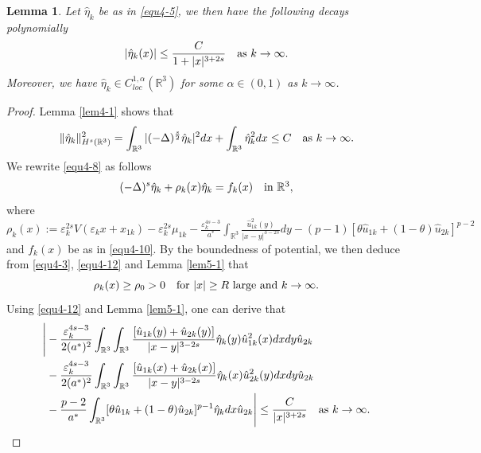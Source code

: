 \documentclass[reqno, 11pt]{amsart} %
\numberwithin{equation}{section}
\newtheorem{lemma}[theorem]{Lemma}
\begin{document}
	\begin{lemma}\label{lem4-2}
		Let $\hat{\eta}_{k}$ be as in \eqref{equ4-5}, we then have the following decays polynomially
		\begin{equation}\label{equ4-16}
			|\hat{\eta}_{k}(x)|\leq\frac{C}{1+|x|^{3+2s}}\quad \hbox{as $k\rightarrow\infty$}.
		\end{equation}
		Moreover, we have $\hat{\eta}_{k}\in C_{loc}^{1, \alpha}(\mathbb{R}^{3})$ for some $\alpha\in(0, 1)$ as $k\rightarrow\infty$. 
	\end{lemma}
	\begin{proof}
		Lemma \ref{lem4-1} shows that
		\begin{equation}\label{equ4-17}
			\|\hat{\eta}_{k}\|_{H^{s}(\mathbb{R}^{3})}^{2}=\int_{\mathbb{R}^{3}}|(-\Delta)^{\frac{s}{2}}\hat{\eta}_{k}|^{2}dx+\int_{\mathbb{R}^{3}}\hat{\eta}_{k}^{2}dx\leq C\quad \hbox{as $k\rightarrow\infty$}.
		\end{equation}
		We rewrite \eqref{equ4-8} as follows
		\begin{equation*}
			(-\Delta)^{s}\hat{\eta}_{k}+\rho_{k}(x)\hat{\eta}_{k}=f_{k}(x) \quad\hbox{in $\mathbb{R}^3$},
		\end{equation*}
		where $\rho_{k}(x):=\varepsilon_{k}^{2s}V(\varepsilon_{k} x+x_{1k})-\varepsilon_{k}^{2s}\mu_{1k}-\frac{\varepsilon_{k}^{4s-3}}{a^{\ast}}\int_{\mathbb{R}^{3}}\frac{\hat{u}_{1k}^{2}(y)}{|x-y|^{3-2s}}dy-(p-1)[\theta\hat{u}_{1k}+(1-\theta)\hat{u}_{2k}]^{p-2}$ and $f_{k}(x)$ be as in \eqref{equ4-10}. By the boundedness of potential, we then deduce from \eqref{equ4-3}, \eqref{equ4-12} and Lemma \ref{lem5-1} that 
		\begin{equation}\label{equ4-18}
			\rho_{k}(x)\geq\rho_{0}>0\quad \hbox{for $|x|\geq R$ large and $k\rightarrow\infty$}.
		\end{equation}
		Using \eqref{equ4-12} and Lemma \ref{lem5-1}, one can derive that
		\begin{equation*}
			\begin{split}
				\Bigg|&-\frac{\varepsilon_{k}^{4s-3}}{2(a^{\ast})^{2}}\int_{\mathbb{R}^{3}}\int_{\mathbb{R}^{3}}\frac{[\hat{u}_{1k}(y)+\hat{u}_{2k}(y)]}{|x-y|^{3-2s}}\hat{\eta}_{k}(y)\hat{u}^{2}_{1k}(x)dxdy\hat{u}_{2k}\\
				&-\frac{\varepsilon_{k}^{4s-3}}{2(a^{\ast})^{2}}\int_{\mathbb{R}^{3}}\int_{\mathbb{R}^{3}}\frac{[\hat{u}_{1k}(x)+\hat{u}_{2k}(x)]}{|x-y|^{3-2s}}\hat{\eta}_{k}(x)\hat{u}^{2}_{2k}(y)dxdy\hat{u}_{2k}\\
				&-\frac{p-2}{a^{\ast}}\int_{\mathbb{R}^{3}}[\theta\hat{u}_{1k}+(1-\theta)\hat{u}_{2k}]^{p-1}\hat{\eta}_{k}dx\hat{u}_{2k}\Bigg|\leq \frac{C}{|x|^{3+2s}}\quad \hbox{as $k\rightarrow\infty$}.

\end{split}
\end{equation*}
\end{proof}
\end{document}
